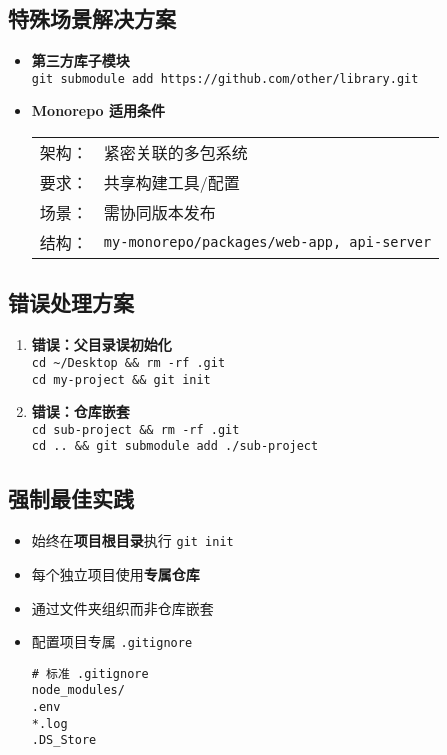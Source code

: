 \subsection{特殊场景解决方案}
\begin{itemize}[leftmargin=*, nosep]
    \item \textbf{第三方库子模块} \\
    \texttt{git submodule add https://github.com/other/library.git}
    
    \item \textbf{Monorepo 适用条件} \\
    \begin{tabular}{@{}ll@{}}
        架构： & 紧密关联的多包系统 \\
        要求： & 共享构建工具/配置 \\
        场景： & 需协同版本发布 \\
        结构： & \texttt{my{-}monorepo/packages/{web{-}app, api{-}server}} 
    \end{tabular}
\end{itemize}

\subsection{错误处理方案}
\begin{enumerate}[leftmargin=*, nosep]
    \item \textbf{错误：父目录误初始化} \\
    \texttt{cd \textasciitilde/Desktop \&\& rm -rf .git} \\
    \texttt{cd my{-}project \&\& git init}
    
    \item \textbf{错误：仓库嵌套} \\
    \texttt{cd sub{-}project \&\& rm -rf .git} \\
    \texttt{cd .. \&\& git submodule add ./sub{-}project}
\end{enumerate}

\subsection{强制最佳实践}
\begin{itemize}[leftmargin=*, nosep]
    \item 始终在\textbf{项目根目录}执行 \texttt{git init}
    \item 每个独立项目使用\textbf{专属仓库}
    \item 通过文件夹组织而非仓库嵌套
    \item 配置项目专属 \texttt{.gitignore} \\
    \begin{minipage}{0.9\linewidth}
\begin{verbatim}
# 标准 .gitignore
node_modules/
.env
*.log
.DS_Store
\end{verbatim}
    \end{minipage}
\end{itemize}

